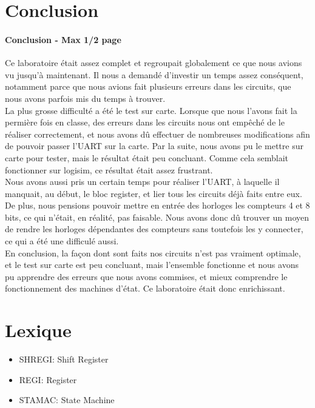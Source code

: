\documentclass[a4paper]{article} %
\begin{document}
\section {Conclusion}
\begin{tcolorbox}[colframe=Monokaimagenta,colback=white]
\paragraph{Conclusion - Max 1/2 page}
Ce laboratoire était assez complet et regroupait globalement ce que nous avions vu jusqu'à maintenant. Il nous a demandé d'investir un temps assez conséquent, notamment parce que nous avions fait plusieurs erreurs dans les circuits, que nous avons parfois mis du temps à trouver.\\
La plus grosse difficulté a été le test sur carte. Lorsque que nous l'avons fait la permière fois en classe, des erreurs dans les circuits nous ont empêché de le réaliser correctement, et nous avons dû effectuer de nombreuses modifications afin de pouvoir passer l'UART sur la carte. Par la suite, nous avons pu le mettre sur carte pour tester, mais le résultat était peu concluant. Comme cela semblait fonctionner sur logisim, ce résultat était assez frustrant.\\
Nous avons aussi pris un certain temps pour réaliser l'UART, à laquelle il manquait, au début, le bloc register, et lier tous les circuits déjà faits entre eux. De plus, nous pensions pouvoir mettre en entrée des horloges les compteurs 4 et 8 bits, ce qui n'était, en réalité, pas faisable. Nous avons donc dû trouver un moyen de rendre les horloges dépendantes des compteurs sans toutefois les y connecter, ce qui a été une difficulé aussi.\\
En conclusion, la façon dont sont faits nos circuits n'est pas vraiment optimale, et le test sur carte est peu concluant, mais l'ensemble fonctionne et nous avons pu apprendre des erreurs que nous avons commises, et mieux comprendre le fonctionnement des machines d'état. Ce laboratoire était donc enrichissant.

\end{tcolorbox}

\section{Lexique}
\begin{itemize}
    \item     SHREGI: Shift Register
    \item     REGI: Register
    \item     STAMAC: State Machine
\end{itemize}
\end{document}
